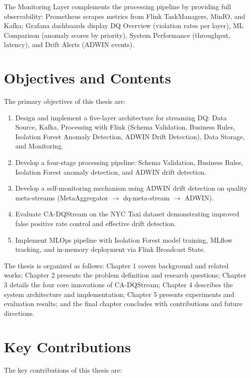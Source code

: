 The Monitoring Layer complements the processing pipeline by providing full observability: Prometheus scrapes metrics from Flink TaskManagers, MinIO, and Kafka; Grafana dashboards display DQ Overview (violation rates per layer), ML Comparison (anomaly scores by priority), System Performance (throughput, latency), and Drift Alerts (ADWIN events).

\section{Objectives and Contents}
The primary objectives of this thesis are:

\begin{enumerate}
    \item Design and implement a five-layer architecture for streaming DQ: Data Source, Kafka, Processing with Flink (Schema Validation, Business Rules, Isolation Forest Anomaly Detection, ADWIN Drift Detection), Data Storage, and Monitoring.
    \item Develop a four-stage processing pipeline: Schema Validation, Business Rules, Isolation Forest anomaly detection, and ADWIN drift detection.
    \item Develop a self-monitoring mechanism using ADWIN drift detection on quality meta-streams (MetaAggregator $\rightarrow$ dq-meta-stream $\rightarrow$ ADWIN).
    \item Evaluate CA-DQStream on the NYC Taxi dataset demonstrating improved false positive rate control and effective drift detection.
    \item Implement MLOps pipeline with Isolation Forest model training, MLflow tracking, and in-memory deployment via Flink Broadcast State.
\end{enumerate}

The thesis is organized as follows: Chapter 1 covers background and related works; Chapter 2 presents the problem definition and research questions; Chapter 3 details the four core innovations of CA-DQStream; Chapter 4 describes the system architecture and implementation; Chapter 5 presents experiments and evaluation results; and the final chapter concludes with contributions and future directions.

\section{Key Contributions}
The key contributions of this thesis are:

